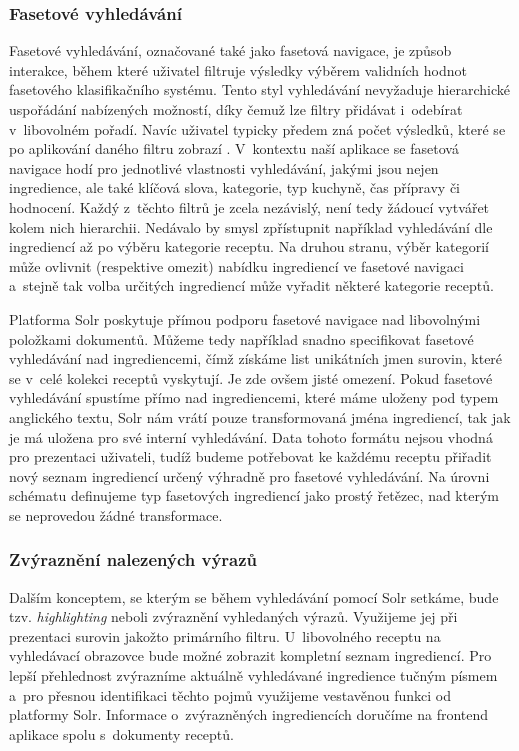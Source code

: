 \subsubsection{Fasetové vyhledávání}

Fasetové vyhledávání, označované také jako fasetová navigace, je způsob interakce, během které uživatel filtruje výsledky výběrem validních hodnot fasetového klasifikačního systému. Tento styl vyhledávání nevyžaduje hierarchické uspořádání nabízených možností, díky čemuž lze filtry přidávat i~odebírat v~libovolném pořadí. Navíc uživatel typicky předem zná počet výsledků, které se po aplikování daného filtru zobrazí \citep{faceted-search}. V~kontextu naší aplikace se fasetová navigace hodí pro jednotlivé vlastnosti vyhledávání, jakými jsou nejen ingredience, ale také klíčová slova, kategorie, typ kuchyně, čas přípravy či hodnocení. Každý z~těchto filtrů je zcela nezávislý, není tedy žádoucí vytvářet kolem nich hierarchii. Nedávalo by smysl zpřístupnit například vyhledávání dle ingrediencí až po výběru kategorie receptu. Na druhou stranu, výběr kategorií může ovlivnit (respektive omezit) nabídku ingrediencí ve fasetové navigaci a~stejně tak volba určitých ingrediencí může vyřadit některé kategorie receptů.

Platforma Solr poskytuje přímou podporu fasetové navigace nad libovolnými položkami dokumentů. Můžeme tedy například snadno specifikovat fasetové vyhledávání nad ingrediencemi, čímž získáme list unikátních jmen surovin, které se v~celé kolekci receptů vyskytují. Je zde ovšem jisté omezení. Pokud fasetové vyhledávání spustíme přímo nad ingrediencemi, které máme uloženy pod typem anglického textu, Solr nám vrátí pouze transformovaná jména ingrediencí, tak jak je má uložena pro své interní vyhledávání. Data tohoto formátu nejsou vhodná pro prezentaci uživateli, tudíž budeme potřebovat ke každému receptu přiřadit nový seznam ingrediencí určený výhradně pro fasetové vyhledávání. Na úrovni schématu definujeme typ fasetových ingrediencí jako prostý řetězec, nad kterým se neprovedou žádné transformace.

\subsubsection{Zvýraznění nalezených výrazů}

Dalším konceptem, se kterým se během vyhledávání pomocí Solr setkáme, bude tzv. \emph{highlighting} neboli zvýraznění vyhledaných výrazů. Využijeme jej při prezentaci surovin jakožto primárního filtru. U~libovolného receptu na vyhledávací obrazovce bude možné zobrazit kompletní seznam ingrediencí. Pro lepší přehlednost zvýrazníme aktuálně vyhledávané ingredience tučným písmem a~pro přesnou identifikaci těchto pojmů využijeme vestavěnou funkci od platformy Solr. Informace o~zvýrazněných ingrediencích doručíme na frontend aplikace spolu s~dokumenty receptů.


